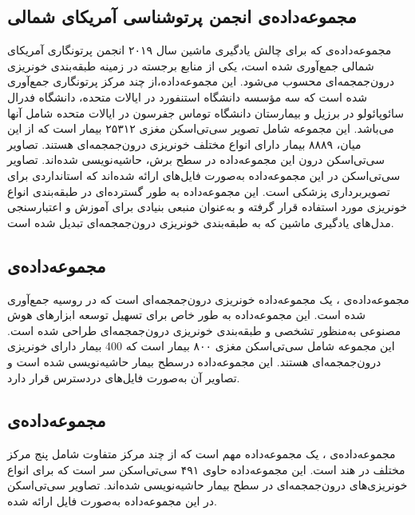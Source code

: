  \subsection{مجموعه‌داده‌ی انجمن پرتوشناسی آمریکای شمالی
  }
 مجموعه‌داده‌ی 
 \cite{rsna_hemorrhage_detection_kaggle,rsna_kaggle}
  که برای چالش یادگیری ماشین سال ۲۰۱۹ انجمن پرتونگاری آمریکای شمالی جمع‌آوری شده است، یکی از منابع برجسته در زمینه طبقه‌بندی خونریزی درون‌جمجمه‌ای محسوب می‌شود. این مجموعه‌داده،از چند مرکز پرتونگاری جمع‌آوری شده است که سه مؤسسه دانشگاه استنفورد در ایالات متحده، دانشگاه فدرال سائوپائولو در برزیل و بیمارستان دانشگاه توماس جفرسون در ایالات متحده شامل آنها می‌باشد. این مجموعه شامل تصویر سی‌تی‌اسکن مغزی ۲۵۳۱۲ بیمار است که از این میان، ۸۸۸۹ بیمار دارای انواع مختلف خونریزی درون‌جمجمه‌ای هستند. تصاویر سی‌تی‌اسکن درون این مجموعه‌داده در سطح برش،‌ حاشیه‌نویسی 
 شده‌اند.  تصاویر سی‌تی‌اسکن در این مجموعه‌داده به‌صورت فایل‌های
   ارائه شده‌اند که استانداردی برای تصویربرداری پزشکی است. این مجموعه‌داده به طور گسترده‌ای در طبقه‌بندی انواع خونریزی مورد استفاده قرار گرفته و به‌عنوان منبعی بنیادی برای آموزش و اعتبارسنجی مدل‌های یادگیری ماشین که به طبقه‌بندی خونریزی درون‌جمجمه‌ای تبدیل شده است.
 
 \subsection{مجموعه‌داده‌ی }
 مجموعه‌داده‌ی
  \cite{medmos_khoruzhaya2024expanded}،
  یک مجموعه‌داده خونریزی درون‌جمجمه‌ای است که در روسیه جمع‌آوری شده است. این مجموعه‌داده به طور خاص برای تسهیل توسعه ابزار‌های هوش مصنوعی به‌منظور تشخصی و طبقه‌بندی خونریزی درون‌جمجمه‌ای طراحی شده است. این مجموعه شامل سی‌تی‌اسکن مغزی ۸۰۰ بیمار است که 400 بیمار دارای خونریزی درون‌جمجمه‌ای هستند. این مجموعه‌داده درسطح بیمار حاشیه‌نویسی شده است و تصاویر آن به‌صورت فایل‌های 
  دردسترس قرار دارد.
 
 \subsection{مجموعه‌داده‌ی }
 مجموعه‌داده‌ی
  \cite{cq500_chilamkurthy2018development}
  ، یک مجموعه‌داده مهم است که از چند مرکز متفاوت شامل پنج مرکز مختلف در هند است. این مجموعه‌داده حاوی ۴۹۱ سی‌تی‌اسکن سر است که برای انواع خونریزی‌های درون‌جمجمه‌ای در سطح بیمار حاشیه‌نویسی شده‌اند. تصاویر سی‌تی‌اسکن در این مجموعه‌داده به‌صورت فایل
    ارائه شده.
